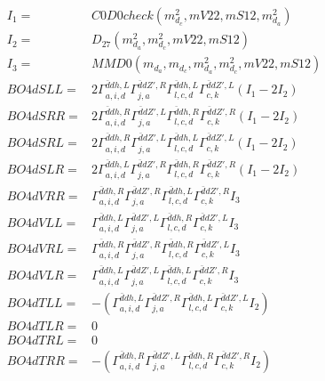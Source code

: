 \documentclass[A4,landscape]{article}
\begin{document}
\begin{align} 
I_1 = & C0D0check(m^2_{d_{{c}}}, mV22, mS12, m^2_{d_{{a}}}) \\ 
I_2 = & D_{27}(m^2_{d_{{a}}}, m^2_{d_{{c}}}, mV22, mS12) \\ 
I_3 = & MMD0(m_{d_{{a}}}, m_{d_{{c}}}, m^2_{d_{{a}}}, m^2_{d_{{c}}}, mV22, mS12) \\ 
  BO4dSLL= & 2  \Gamma^{\bar{d}d h ,L}_{a, i, d} \Gamma^{\bar{d}d {Z'} ,R}_{j, a} \Gamma^{\bar{d}d h ,L}_{l, c, d} \Gamma^{\bar{d}d {Z'} ,L}_{c, k} (I_1 - 2 I_2) \\ 
  BO4dSRR= & 2  \Gamma^{\bar{d}d h ,R}_{a, i, d} \Gamma^{\bar{d}d {Z'} ,L}_{j, a} \Gamma^{\bar{d}d h ,R}_{l, c, d} \Gamma^{\bar{d}d {Z'} ,R}_{c, k} (I_1 - 2 I_2) \\ 
  BO4dSRL= & 2  \Gamma^{\bar{d}d h ,R}_{a, i, d} \Gamma^{\bar{d}d {Z'} ,L}_{j, a} \Gamma^{\bar{d}d h ,L}_{l, c, d} \Gamma^{\bar{d}d {Z'} ,L}_{c, k} (I_1 - 2 I_2) \\ 
  BO4dSLR= & 2  \Gamma^{\bar{d}d h ,L}_{a, i, d} \Gamma^{\bar{d}d {Z'} ,R}_{j, a} \Gamma^{\bar{d}d h ,R}_{l, c, d} \Gamma^{\bar{d}d {Z'} ,R}_{c, k} (I_1 - 2 I_2) \\ 
  BO4dVRR= &  \Gamma^{\bar{d}d h ,R}_{a, i, d} \Gamma^{\bar{d}d {Z'} ,R}_{j, a} \Gamma^{\bar{d}d h ,L}_{l, c, d} \Gamma^{\bar{d}d {Z'} ,R}_{c, k} I_3 \\ 
  BO4dVLL= &  \Gamma^{\bar{d}d h ,L}_{a, i, d} \Gamma^{\bar{d}d {Z'} ,L}_{j, a} \Gamma^{\bar{d}d h ,R}_{l, c, d} \Gamma^{\bar{d}d {Z'} ,L}_{c, k} I_3 \\ 
  BO4dVRL= &  \Gamma^{\bar{d}d h ,R}_{a, i, d} \Gamma^{\bar{d}d {Z'} ,R}_{j, a} \Gamma^{\bar{d}d h ,R}_{l, c, d} \Gamma^{\bar{d}d {Z'} ,L}_{c, k} I_3 \\ 
  BO4dVLR= &  \Gamma^{\bar{d}d h ,L}_{a, i, d} \Gamma^{\bar{d}d {Z'} ,L}_{j, a} \Gamma^{\bar{d}d h ,L}_{l, c, d} \Gamma^{\bar{d}d {Z'} ,R}_{c, k} I_3 \\ 
  BO4dTLL= & -( \Gamma^{\bar{d}d h ,L}_{a, i, d} \Gamma^{\bar{d}d {Z'} ,R}_{j, a} \Gamma^{\bar{d}d h ,L}_{l, c, d} \Gamma^{\bar{d}d {Z'} ,L}_{c, k} I_2) \\ 
  BO4dTLR= & 0 \\ 
  BO4dTRL= & 0 \\ 
  BO4dTRR= & -( \Gamma^{\bar{d}d h ,R}_{a, i, d} \Gamma^{\bar{d}d {Z'} ,L}_{j, a} \Gamma^{\bar{d}d h ,R}_{l, c, d} \Gamma^{\bar{d}d {Z'} ,R}_{c, k} I_2) \\ 
\end{align} 
\end{document}
